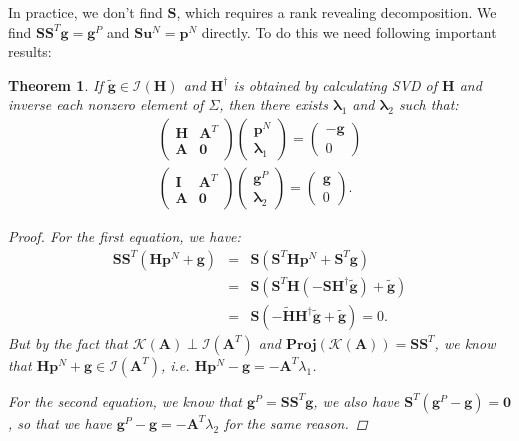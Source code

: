 \documentclass[annual]{acmsiggraph}
\newcommand{\E}[1]{\mathbf{#1}}
\newcommand{\TWOC}[2]{\left(\begin{array}{c}#1 \\ #2\end{array}\right)}
\newcommand{\MTT}[4]{\left(\begin{array}{cc}#1 & #2 \\ #3 & #4\end{array}\right)}
\newtheorem{myTheo}{Theorem}
\begin{document}
In practice, we don't find $\E{S}$, which requires a rank revealing decomposition. We find $\E{S}\E{S}^T\E{g}=\E{g}^P$ and $\E{S}\E{u}^N=\E{p}^N$ directly. To do this we need following important results:
\begin{myTheo}
\label{Thm:THEO}
If $\tilde{\E{g}} \in \mathcal{I}(\E{H})$ and $\E{H}^\dagger$ is obtained by calculating SVD of $\E{H}$ and inverse each nonzero element of $\Sigma$, then there exists $\E{\lambda}_1$ and $\E{\lambda}_2$ such that:
\begin{eqnarray*}
\MTT{\E{H}}{\E{A}^T}{\E{A}}{\E{0}}\TWOC{\E{p}^N}{\E{\lambda}_1}=\TWOC{-\E{g}}{0}	\\
\MTT{\E{I}}{\E{A}^T}{\E{A}}{\E{0}}\TWOC{\E{g}^P}{\E{\lambda}_2}=\TWOC{\E{g}}{0}.
\end{eqnarray*}
\begin{proof}
For the first equation, we have:
\begin{eqnarray*}
\E{S}\E{S}^T(\E{H}\E{p}^N+\E{g})&=&\E{S}(\E{S}^T\E{H}\E{p}^N+\E{S}^T\E{g})	\\
&=&\E{S}(\E{S}^T\E{H}(-\E{S}\E{H}^\dagger\tilde{\E{g}})+\tilde{\E{g}})	\\
&=&\E{S}(-\tilde{\E{H}}\E{H}^\dagger\tilde{\E{g}}+\tilde{\E{g}})=0.
\end{eqnarray*}
But by the fact that $\mathcal{K}(\E{A})\perp\mathcal{I}(\E{A}^T)$ and $\E{Proj}(\mathcal{K}(\E{A}))=\E{S}\E{S}^T$, we know that $\E{H}\E{p}^N+\E{g} \in \mathcal{I}(\E{A}^T)$, i.e. $\E{H}\E{p}^N-\E{g}=-\E{A}^T\lambda_1$.

For the second equation, we know that $\E{g}^P=\E{S}\E{S}^T\E{g}$, we also have $\E{S}^T(\E{g}^P-\E{g})=\E{0}$, so that we have $\E{g}^P-\E{g}=-\E{A}^T\lambda_2$ for the same reason.
\end{proof}
\end{myTheo}
\end{document}

